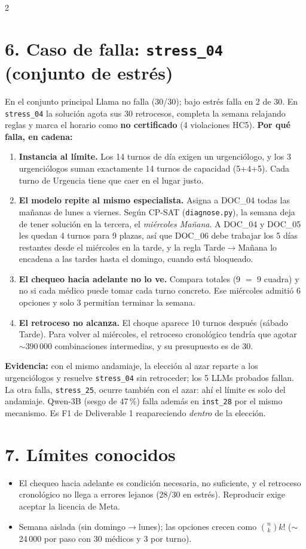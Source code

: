 \documentclass[9pt,a4paper]{extarticle}
\begin{document}
\begin{multicols}{2}
\section{6. Caso de falla: \texttt{stress\_04} (conjunto de estrés)}
En el conjunto principal Llama no falla (30/30); bajo estrés falla en 2 de 30. En \texttt{stress\_04} la solución agota sus 30 retrocesos, completa la semana relajando reglas y marca el horario como \textbf{no certificado} (4 violaciones HC5). \textbf{Por qué falla, en cadena:}
\begin{enumerate}[label=\textbf{\arabic*.},leftmargin=1.1em]
    \item \textbf{Instancia al límite.} Los 14 turnos de día exigen un urgenciólogo, y los 3 urgenciólogos suman exactamente 14 turnos de capacidad (5+4+5). Cada turno de Urgencia tiene que caer en el lugar justo.
    \item \textbf{El modelo repite al mismo especialista.} Asigna a DOC\_04 todas las mañanas de lunes a viernes. Según CP-SAT (\texttt{diagnose.py}), la semana deja de tener solución en la tercera, el \emph{miércoles Mañana}. A DOC\_04 y DOC\_05 les quedan 4 turnos para 9 plazas, así que DOC\_06 debe trabajar los 5 días restantes desde el miércoles en la tarde, y la regla Tarde$\to$Mañana lo encadena a las tardes hasta el domingo, cuando está bloqueado.
    \item \textbf{El chequeo hacia adelante no lo ve.} Compara totales (9 $=$ 9 cuadra) y no si cada médico puede tomar cada turno concreto. Ese miércoles admitió 6 opciones y solo 3 permitían terminar la semana.
    \item \textbf{El retroceso no alcanza.} El choque aparece 10 turnos después (sábado Tarde). Para volver al miércoles, el retroceso cronológico tendría que agotar $\sim$390\,000 combinaciones intermedias, y su presupuesto es de 30.
\end{enumerate}
\textbf{Evidencia:} con el mismo andamiaje, la elección al azar reparte a los urgenciólogos y resuelve \texttt{stress\_04} sin retroceder; los 5 LLMs probados fallan. La otra falla, \texttt{stress\_25}, ocurre también con el azar: ahí el límite es solo del andamiaje. Qwen-3B (sesgo de 47\,\%) falla además en \texttt{inst\_28} por el mismo mecanismo. Es F1 de Deliverable 1 reapareciendo \emph{dentro} de la elección.

\section{7. Límites conocidos}
\begin{itemize}[label=$\blacktriangleright$]
    \item El chequeo hacia adelante es condición necesaria, no suficiente, y el retroceso cronológico no llega a errores lejanos (28/30 en estrés). Reproducir exige aceptar la licencia de Meta.
    \item Semana aislada (sin domingo$\to$lunes); las opciones crecen como $\binom{n}{k}k!$ ($\sim$24\,000 por paso con 30 médicos y 3 por turno).\end{itemize}


\end{multicols}
\end{document}
